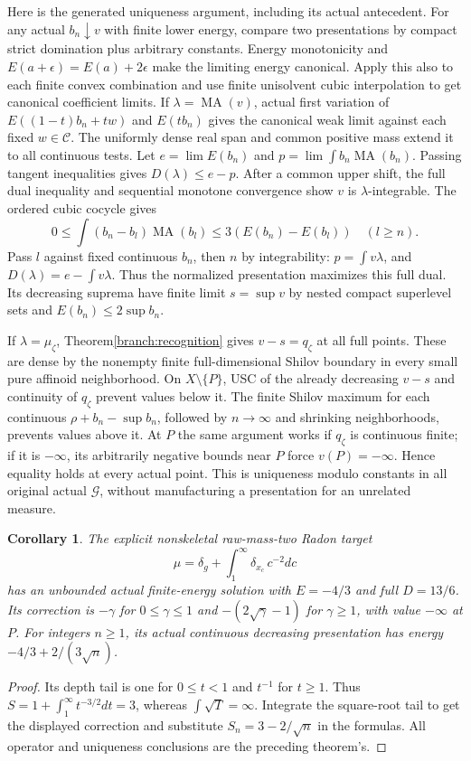 \documentclass[11pt]{article}
\newtheorem{corollary}[theorem]{Corollary}
\newcommand{\MA}{\operatorname{MA}}
\newcommand{\C}{\mathcal C}
\begin{document}
Here is the generated uniqueness argument, including its actual antecedent.
For any actual $b_n\downarrow v$ with finite lower energy, compare two
presentations by compact strict domination plus arbitrary constants.
Energy monotonicity and $E(a+\epsilon)=E(a)+2\epsilon$ make the limiting
energy canonical. Apply this also to each finite convex combination and
use finite unisolvent cubic interpolation to get canonical coefficient
limits. If $\lambda=\MA(v)$, actual first variation of
$E((1-t)b_n+tw)$ and $E(tb_n)$ gives the canonical weak limit against each
fixed $w\in\C$. The uniformly dense real span and common positive mass
extend it to all continuous tests. Let $e=\lim E(b_n)$ and
$p=\lim\int b_n\MA(b_n)$. Passing tangent inequalities gives
$D(\lambda)\le e-p$. After a common upper shift, the full dual inequality
and sequential monotone convergence show $v$ is $\lambda$-integrable.
The ordered cubic cocycle gives
\[
 0\le\int(b_n-b_l)\MA(b_l)\le3(E(b_n)-E(b_l))\quad(l\ge n).
\]
Pass $l$ against fixed continuous $b_n$, then $n$ by integrability:
$p=\int v\lambda$, and $D(\lambda)=e-\int v\lambda$.
Thus the normalized presentation maximizes this full dual. Its decreasing
suprema have finite limit $s=\sup v$ by nested compact superlevel sets
and $E(b_n)\le2\sup b_n$.

If $\lambda=\mu_\zeta$, Theorem\ref{branch:recognition} gives
$v-s=q_\zeta$ at all full points. These are dense by the nonempty finite
full-dimensional Shilov boundary in every small pure affinoid neighborhood.
On $X\setminus\{P\}$, USC of the already decreasing $v-s$ and continuity
of $q_\zeta$ prevent values below it. The finite Shilov maximum for each
continuous $\rho+b_n-\sup b_n$, followed by $n\to\infty$ and shrinking
neighborhoods, prevents values above it. At $P$ the same argument works
if $q_\zeta$ is continuous finite; if it is $-\infty$, its arbitrarily
negative bounds near $P$ force $v(P)=-\infty$. Hence equality holds at
every actual point. This is uniqueness modulo constants in all original
actual $\mathcal G$, without manufacturing a presentation for an unrelated
measure.

\begin{corollary}\label{branch:unboundedexample}
The explicit nonskeletal raw-mass-two Radon target
\[
 \mu=\delta_g+\int_1^\infty\delta_{x_c}\,c^{-2}dc
\]
has an unbounded actual finite-energy solution with
$E=-4/3$ and full $D=13/6$. Its correction is $-\gamma$ for
$0\le\gamma\le1$ and $-(2\sqrt\gamma-1)$ for $\gamma\ge1$, with value
$-\infty$ at $P$. For integers $n\ge1$, its actual continuous decreasing
presentation has energy $-4/3+2/(3\sqrt n)$.
\end{corollary}
\begin{proof}
Its depth tail is one for $0\le t<1$ and $t^{-1}$ for $t\ge1$.
Thus $S=1+\int_1^\infty t^{-3/2}dt=3$, whereas
$\int\sqrt{T}=\infty$. Integrate the square-root tail to get the
displayed correction and substitute $S_n=3-2/\sqrt n$ in the formulas.
All operator and uniqueness conclusions are the preceding theorem's.
\end{proof}
\end{document}

